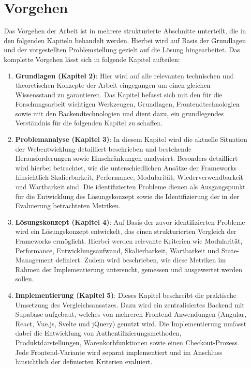\documentclass[oneside]{ausarbeitung}
\begin{document}
\section{Vorgehen}
\label{sec:vorgehen}

Das Vorgehen der Arbeit ist in mehrere strukturierte Abschnitte unterteilt, die in den folgenden Kapiteln behandelt werden. Hierbei wird auf Basis der Grundlagen und der vorgestellten Problemstellung gezielt auf die Lösung hingearbeitet. 
Das komplette Vorgehen lässt sich in folgende Kapitel aufteilen: 

\begin{enumerate}  
\item \textbf{Grundlagen (Kapitel 2)}: Hier wird auf alle relevanten technischen und theoretischen Konzepte der Arbeit eingegangen um einen gleichen Wissensstand zu garantieren. Das Kapitel befasst sich mit den für die Forschungsarbeit wichtigen Werkzeugen, Grundlagen, Frontendtechnologien sowie mit den Backendtechnologien und dient dazu, ein grundlegendes Verständnis für die folgenden Kapitel zu schaffen. 
    
\item \textbf{Problemanalyse (Kapitel 3)}: In diesem Kapitel wird die aktuelle Situation der Webentwicklung detailliert beschrieben und bestehende Herausforderungen sowie Einschränkungen analysiert. Besonders detailliert wird hierbei betrachtet, wie die unterschiedlichen Ansätze der Frameworks hinsichtlich Skalierbarkeit, Performance, Modularität, Wiederverwendbarkeit und Wartbarkeit sind. Die identifizierten Probleme dienen als Ausgangspunkt für die Entwicklung des Lösungskonzept sowie die Identifizierung der in der Evaluierung betrachteten Metriken.

\item \textbf{Lösungskonzept (Kapitel 4)}: Auf Basis der zuvor identifizierten Probleme wird ein Lösungskonzept entwickelt, das einen strukturierten Vergleich der Frameworks ermöglicht. Hierbei werden relevante Kriterien wie Modularität, Performance, Entwicklungsaufwand, Skalierbarkeit, Wartbarkeit und State-Management definiert. Zudem wird beschrieben, wie diese Metriken im Rahmen der Implementierung untersucht, gemessen und ausgewertet werden sollen.

\item \textbf{Implementierung (Kapitel 5)}: Dieses Kapitel beschreibt die praktische Umsetzung des Vergleichsansatzes. Dazu wird ein zentralisiertes Backend mit Supabase aufgebaut, welches von mehreren Frontend-Anwendungen (Angular, React, Vue.js, Svelte und jQuery) genutzt wird. Die Implementierung umfasst dabei die Entwicklung von Authentifizierungsmethoden, Produktdarstellungen, Warenkorbfunktionen sowie einen Checkout-Prozess. Jede Frontend-Variante wird separat implementiert und im Anschluss hinsichtlich der definierten Kriterien evaluiert.


\end{enumerate}
\end{document}

